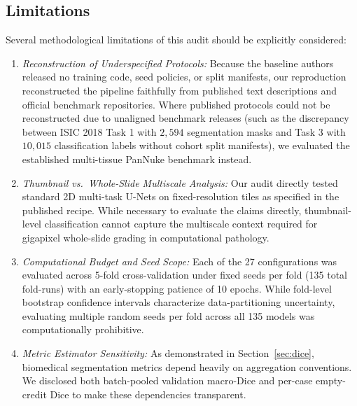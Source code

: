 \documentclass[preprint,12pt]{elsarticle}
\begin{document}
\subsection{Limitations}\label{sec:limitations}
Several methodological limitations of this audit should be explicitly considered:
\begin{enumerate}
    \item \emph{Reconstruction of Underspecified Protocols:} Because the baseline authors released no training code, seed policies, or split manifests, our reproduction reconstructed the pipeline faithfully from published text descriptions and official benchmark repositories. Where published protocols could not be reconstructed due to unaligned benchmark releases (such as the discrepancy between ISIC 2018 Task 1 with $2,594$ segmentation masks and Task 3 with $10,015$ classification labels without cohort split manifests), we evaluated the established multi-tissue PanNuke benchmark instead.
    \item \emph{Thumbnail vs.\ Whole-Slide Multiscale Analysis:} Our audit directly tested standard 2D multi-task U-Nets on fixed-resolution tiles as specified in the published recipe. While necessary to evaluate the claims directly, thumbnail-level classification cannot capture the multiscale context required for gigapixel whole-slide grading in computational pathology.
    \item \emph{Computational Budget and Seed Scope:} Each of the 27 configurations was evaluated across 5-fold cross-validation under fixed seeds per fold (135 total fold-runs) with an early-stopping patience of 10 epochs. While fold-level bootstrap confidence intervals characterize data-partitioning uncertainty, evaluating multiple random seeds per fold across all 135 models was computationally prohibitive.
    \item \emph{Metric Estimator Sensitivity:} As demonstrated in Section~\ref{sec:dice}, biomedical segmentation metrics depend heavily on aggregation conventions. We disclosed both batch-pooled validation macro-Dice and per-case empty-credit Dice to make these dependencies transparent.
\end{enumerate}
\end{document}
